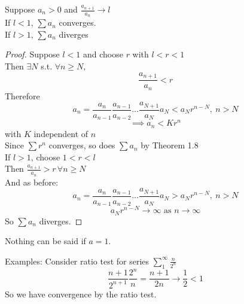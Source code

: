 \begin{theorem}
Suppose $a_n > 0$ and $\frac{a_{n+1}}{a_n} \to l$\\
If $l < 1, \, \sum a_n$ converges.\\
If $l > 1,\, \sum a_n$ diverges
\begin{proof}
Suppose $l < 1$ and choose $r$ with $l < r < 1$\\
Then $\exists N$ s.t. $\forall n \geq N,$
\[\frac{a_{n+1}}{a_n} < r\]
Therefore \[a_n = \frac{a_n}{a_{n-1}} \frac{a_{n-1}}{a_{n-2}} \dots \frac{a_{N+1}}{a_N}a_N < a_N r^{n-N}, \ n > N\]
\[\implies a_n < K r^n\]
with $K$ independent of $n$\\
Since $\sum r^n$ converges, so does $\sum a_n$ by Theorem 1.8\\
If $l > 1$, choose $1 < r < l$\\
Then $\frac{a_{n+1}}{a_n} > r \, \forall n \geq N$\\
And as before:
\[a_n = \frac{a_n}{a_{n-1}} \frac{a_{n-1}}{a_{n-2}} \dots \frac{a_{N+1}}{a_N}a_N > a_N r^{n-N}, \ n > N\]
\[a_Nr^{n-N} \to \infty\text{ as } n \to \infty\]
So $\sum a_n$ diverges.
\end{proof}
\begin{remark}
Nothing can be said if $a = 1$.
\end{remark}
\end{theorem}
\begin{normal}
Examples:
Consider ratio test for series $\sum\limits_1^\infty \frac{n}{2^n}$
\[\frac{n+1}{2^{n+1}} \frac{2^n}{n} = \frac{n+1}{2n}\to \frac{1}{2} < 1\]
So we have convergence by the ratio test.\\
\end{normal}

